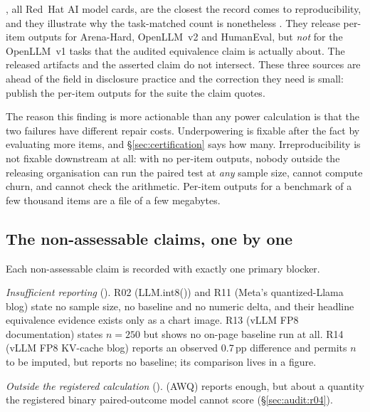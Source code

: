 \AuditPerItemOtherTaskClaims{}, all Red~Hat AI model cards, are the closest the
record comes to reproducibility, and they illustrate why the task-matched count
is nonetheless \AuditPerItemTaskMatched{}. They release per-item outputs for
Arena-Hard, OpenLLM~v2 and HumanEval, but \emph{not} for the OpenLLM~v1 tasks
that the audited equivalence claim is actually about. The released artifacts and
the asserted claim do not intersect. These three sources are ahead of the field
in disclosure practice and the correction they need is small: publish the
per-item outputs for the suite the claim quotes.

The reason this finding is more actionable than any power calculation is that the
two failures have different repair costs. Underpowering is fixable after the fact
by evaluating more items, and \S\ref{sec:certification} says how many.
Irreproducibility is not fixable downstream at all: with no per-item outputs,
nobody outside the releasing organisation can run the paired test at \emph{any}
sample size, cannot compute churn, and cannot check the arithmetic. Per-item
outputs for a benchmark of a few thousand items are a file of a few megabytes.

\subsection{The non-assessable claims, one by one}
\label{app:audit:indeterminate}

Each non-assessable claim is recorded with exactly one primary blocker.

\emph{Insufficient reporting} (\AuditNotAssessableInsufficient{}). R02
(LLM.int8()) and R11 (Meta's quantized-Llama blog) state no sample size, no
baseline and no numeric delta, and their headline equivalence evidence exists
only as a chart image. R13 (vLLM FP8 documentation) states $n = 250$ but shows no
on-page baseline run at all. R14 (vLLM FP8 KV-cache blog) reports an observed
0.7\,pp difference and permits $n$ to be imputed, but reports no baseline; its
comparison lives in a figure.

\emph{Outside the registered calculation}
(\AuditNotAssessableOutsideFramework{}). \AuditOutsideFrameworkClaim{} (AWQ)
reports enough, but about a quantity the registered binary paired-outcome model
cannot score (\S\ref{sec:audit:r04}).

